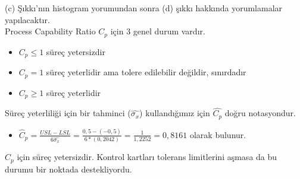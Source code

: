 (c) Şıkkı’nın histogram yorumundan sonra (d) şıkkı hakkında yorumlamalar yapılacaktır.\\

Process Capability Ratio $C_p$ için 3 genel durum vardır.
\begin{itemize}[label*={}]
	\item 
	$C_p \le 1$ süreç yetersizdir
	\item 
	$C_p = 1$ süreç yeterlidir ama tolere edilebilir değildir, sınırdadır
	\item 
	$C_p \ge 1$ süreç yeterlidir\\
	\end{itemize}
	
	Süreç yeterliliği için bir tahminci ($\hat{\sigma_x}$) kullandığımız için $\hat{C_p}$ doğru notasyondur.
\begin{itemize}[label*={}]
	\item
	$\hat{C}_p = \frac{USL-LSL}{6\hat{\sigma_x}} = \frac{0,5-(-0,5)}{6*(0,2042)} = \frac{1}{1,2252} = 0,8161$ olarak bulunur.

 \end{itemize}

	
$C_p$ için süreç yetersizdir. Kontrol kartları tolerans limitlerini aşmasa da bu durumu bir noktada destekliyordu.\\